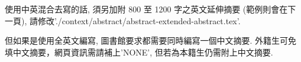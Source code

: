 \StartAbstractChi

使用中英混合去寫的話, 須另加附 800 至 1200 字之英文延伸摘要 (範例則會在下一頁), 請修改'./context/abstract/abstract-extended-abstract.tex'.

但如果是使用全英文編寫, 圖書館要求都需要同時編寫一個中文摘要. 外籍生可免填中文摘要，網頁資訊需請補上'NONE', 但若為本籍生仍需附上中文摘要.

\EndAbstractChi
